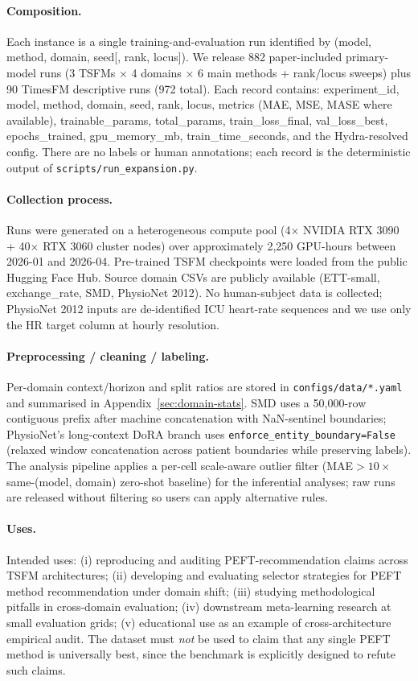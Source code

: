 \paragraph{Composition.} Each instance is a single training-and-evaluation run identified by (model, method, domain, seed[, rank, locus]). We release 882 paper-included primary-model runs (3 TSFMs $\times$ 4 domains $\times$ 6 main methods + rank/locus sweeps) plus 90 TimesFM descriptive runs (972 total). Each record contains: experiment\_id, model, method, domain, seed, rank, locus, metrics (MAE, MSE, MASE where available), trainable\_params, total\_params, train\_loss\_final, val\_loss\_best, epochs\_trained, gpu\_memory\_mb, train\_time\_seconds, and the Hydra-resolved config. There are no labels or human annotations; each record is the deterministic output of \texttt{scripts/run\_expansion.py}.

\paragraph{Collection process.} Runs were generated on a heterogeneous compute pool (4$\times$ NVIDIA RTX 3090 + 40$\times$ RTX 3060 cluster nodes) over approximately 2{,}250 GPU-hours between 2026-01 and 2026-04. Pre-trained TSFM checkpoints were loaded from the public Hugging Face Hub. Source domain CSVs are publicly available (ETT-small, exchange\_rate, SMD, PhysioNet 2012). No human-subject data is collected; PhysioNet 2012 inputs are de-identified ICU heart-rate sequences and we use only the HR target column at hourly resolution.

\paragraph{Preprocessing / cleaning / labeling.} Per-domain context/horizon and split ratios are stored in \texttt{configs/data/*.yaml} and summarised in Appendix~\ref{sec:domain-stats}. SMD uses a 50{,}000-row contiguous prefix after machine concatenation with NaN-sentinel boundaries; PhysioNet's long-context DoRA branch uses \texttt{enforce\_entity\_boundary=False} (relaxed window concatenation across patient boundaries while preserving labels). The analysis pipeline applies a per-cell scale-aware outlier filter (MAE${>}10\times$ same-(model, domain) zero-shot baseline) for the inferential analyses; raw runs are released without filtering so users can apply alternative rules.

\paragraph{Uses.} Intended uses: (i) reproducing and auditing PEFT-recommendation claims across TSFM architectures; (ii) developing and evaluating selector strategies for PEFT method recommendation under domain shift; (iii) studying methodological pitfalls in cross-domain evaluation; (iv) downstream meta-learning research at small evaluation grids; (v) educational use as an example of cross-architecture empirical audit. The dataset must \emph{not} be used to claim that any single PEFT method is universally best, since the benchmark is explicitly designed to refute such claims.

